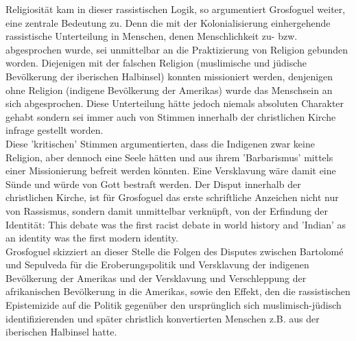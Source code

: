 \noindent Religiosität kam in dieser rassistischen Logik, so argumentiert Grosfoguel
weiter, eine zentrale Bedeutung zu. Denn die mit der Kolonialisierung
einhergehende rassistische Unterteilung in Menschen, denen Menschlichkeit zu-
bzw. abgesprochen wurde, sei unmittelbar an die Praktizierung von Religion
gebunden worden. Diejenigen mit der falschen Religion (muslimische und jüdische
Bevölkerung der iberischen Halbinsel) konnten missioniert werden, denjenigen
ohne Religion (indigene Bevölkerung der Amerikas) wurde das Menschsein an sich
abgesprochen.\footnotemark {} 
Diese Unterteilung hätte jedoch niemals absoluten Charakter
gehabt sondern sei immer auch von Stimmen innerhalb der christlichen Kirche
infrage gestellt worden.\\
Diese 'kritischen' Stimmen argumentierten, dass die Indigenen zwar keine
Religion, aber dennoch eine Seele hätten und aus ihrem 'Barbarismus' mittels
einer Missionierung befreit werden könnten. \footnotemark {}
Eine Versklavung wäre damit eine
Sünde und würde von Gott bestraft werden. Der Disput innerhalb der christlichen
Kirche, ist für Grosfoguel das erste schriftliche Anzeichen nicht nur von
Rassismus, sondern damit unmittelbar verknüpft, von der Erfindung der
Identität: \glqq This debate was the first racist debate in world history and
'Indian' as an identity was the first modern identity. \grqq \footnotemark
{} \\
Grosfoguel skizziert an dieser Stelle
die Folgen des Disputes zwischen Bartolomé und Sepulveda für die
Eroberungspolitik und Versklavung der indigenen Bevölkerung der Amerikas und
der Versklavung und Verschleppung der afrikanischen Bevölkerung in die
Amerikas, sowie den Effekt, den die rassistischen Epistemizide auf die Politik
gegenüber den ursprünglich sich muslimisch-jüdisch identifizierenden und später
christlich konvertierten Menschen z.B. aus der iberischen Halbinsel
hatte.\footnotemark {} \\

